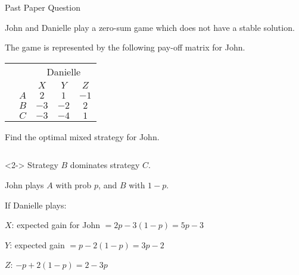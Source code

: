 \documentclass[8pt]{beamer}
\begin{document}
\begin{frame}[shrink]{Past Paper Question}
	\begin{problem}
		John and Danielle play a zero-sum game which does not have a stable solution.

		The game is represented by the following pay-off matrix for John.

			\begin{center}	
			\colorbox{cc}{
  \setlength\arrayrulewidth{0.5mm}
	\begin{tabular}{cc|ccc}
\multicolumn{2}{c}{} & \multicolumn{3}{c}{Danielle}\\
\multicolumn{1}{c}{} &  & $X$  & $Y$ & $Z$ \\ \hline 
\raisebox{0cm}{\multirow{3}*{\rotatebox{90}{John}}}  & $A$ & $2$ & $1$ & $-1$ \\
						     & $B$ & $-3$ & $-2$ & $2$ \\
						     & $C$ & $-3$ & $-4$ & $1$ \\
\end{tabular}}
\end{center}
Find the optimal mixed strategy for John.
	\end{problem}
	\begin{columns}
	\begin{column}{.5\linewidth}
	\begin{solution}<2->
		Strategy $B$ dominates strategy $C$.

		John plays  $A$ with prob $p$, and $B$ with  $1-p$.

		If Danielle plays:

		$X$: expected gain for John  $=2p-3(1-p)=5p-3$

		$Y$: expected gain  $=p-2(1-p)=3p-2$

		$Z$:  $-p+2(1-p)=2-3p$
	\end{solution}
	\end{column}
	\begin{column}{.5\linewidth}
		\begin{solution}
\end{solution}
\end{column}
\end{columns}
\end{frame}
\end{document}
